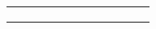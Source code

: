 \documentclass{article}
\begin{document}
\begin{table}[hb]
{\begin{tabular}{|l|l|l|l|l|l|l|l|l|l|l|}
                                                                   &        &            &         &                                                          &                                                                    &                                                                  &                                                               &                                                            &                                                                             &                                                                                               \\ \cline{1-4} \cline{6-11} 
                                                                   &        &            &         &                                                          &                                                                    &                                                                  &                                                               &                                                            &                                                                             &                                                                                               \\ \cline{1-4} \cline{6-11} 
                                                                   &        &            &         &                                                          &                                                                    &                                                                  &                                                               &                                                            &                                                                             &                                                                                               \\ \hline
\end{tabular}}
\end{table}
\end{document}
